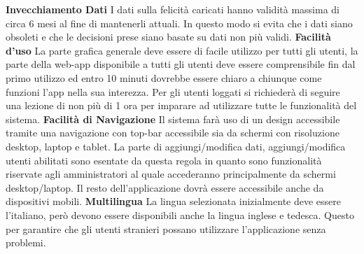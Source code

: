 \begin{rnfList}
        \rnfItem \textbf{Invecchiamento Dati} I dati sulla felicità caricati hanno validità massima di circa 6 mesi al fine di mantenerli attuali. In questo modo si evita che i dati siano obsoleti e che le decisioni prese siano basate su dati non più validi.
        \rnfItem \textbf{Facilità d'uso} La parte grafica generale deve essere di facile utilizzo per tutti gli utenti, la parte della web-app disponibile a tutti gli utenti deve essere comprensibile fin dal primo utilizzo ed entro 10 minuti dovrebbe essere chiaro a chiunque come funzioni l'app nella sua interezza. Per gli utenti loggati si richiederà di seguire una lezione di non più di 1 ora per imparare ad utilizzare tutte le funzionalità del sistema.
        \rnfItem \textbf{Facilità di Navigazione} Il sistema farà uso di un design accessibile tramite una navigazione con top-bar accessibile sia da schermi con risoluzione desktop, laptop e tablet. La parte di aggiungi/modifica dati, aggiungi/modifica utenti abilitati sono esentate da questa regola in quanto sono funzionalità riservate agli amministratori al quale accederanno principalmente da schermi desktop/laptop. Il resto dell'applicazione dovrà essere accessibile anche da dispositivi mobili.
        \rnfItem \textbf{Multilingua} La lingua selezionata inizialmente deve essere l'italiano, però devono essere disponibili anche la lingua inglese e tedesca. Questo per garantire che gli utenti stranieri possano utilizzare l'applicazione senza problemi.
    \end{rnfList}